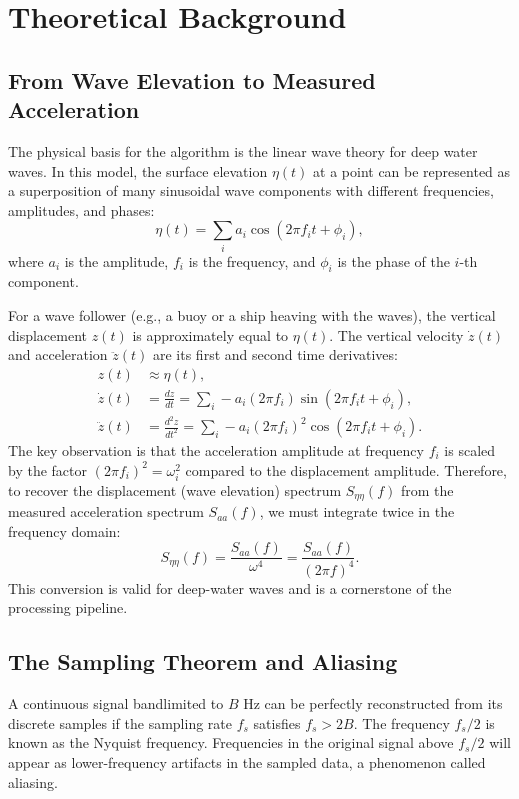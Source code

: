 \documentclass[11pt,letterpaper]{article}
\begin{document}
\section{Theoretical Background}
\label{sec:theory}

\subsection{From Wave Elevation to Measured Acceleration}
The physical basis for the algorithm is the linear wave theory for deep water waves. In this model, the surface elevation $\eta(t)$ at a point can be represented as a superposition of many sinusoidal wave components with different frequencies, amplitudes, and phases:
\begin{equation}
\eta(t) = \sum_{i} a_i \cos(2\pi f_i t + \phi_i),
\end{equation}
where $a_i$ is the amplitude, $f_i$ is the frequency, and $\phi_i$ is the phase of the $i$-th component.

For a wave follower (e.g., a buoy or a ship heaving with the waves), the vertical displacement $z(t)$ is approximately equal to $\eta(t)$. The vertical velocity $\dot{z}(t)$ and acceleration $\ddot{z}(t)$ are its first and second time derivatives:
\begin{align}
z(t) &\approx \eta(t), \\
\dot{z}(t) &= \frac{dz}{dt} = \sum_{i} -a_i (2\pi f_i) \sin(2\pi f_i t + \phi_i), \\
\ddot{z}(t) &= \frac{d^2z}{dt^2} = \sum_{i} -a_i (2\pi f_i)^2 \cos(2\pi f_i t + \phi_i).
\end{align}
The key observation is that the acceleration amplitude at frequency $f_i$ is scaled by the factor $(2\pi f_i)^2 = \omega_i^2$ compared to the displacement amplitude. Therefore, to recover the displacement (wave elevation) spectrum $S_{\eta\eta}(f)$ from the measured acceleration spectrum $S_{aa}(f)$, we must integrate twice in the frequency domain:
\begin{equation}
\label{eq:acc2disp}
S_{\eta\eta}(f) = \frac{S_{aa}(f)}{\omega^4} = \frac{S_{aa}(f)}{(2\pi f)^4}.
\end{equation}
This conversion is valid for deep-water waves and is a cornerstone of the processing pipeline.

\subsection{The Sampling Theorem and Aliasing}
\label{subsec:nyquist}
\begin{keyconcept}
A continuous signal bandlimited to $B$ Hz can be perfectly reconstructed from its discrete samples if the sampling rate $f_s$ satisfies $f_s > 2B$. The frequency $f_s/2$ is known as the Nyquist frequency. Frequencies in the original signal above $f_s/2$ will appear as lower-frequency artifacts in the sampled data, a phenomenon called aliasing.
\end{keyconcept}
\end{document}
